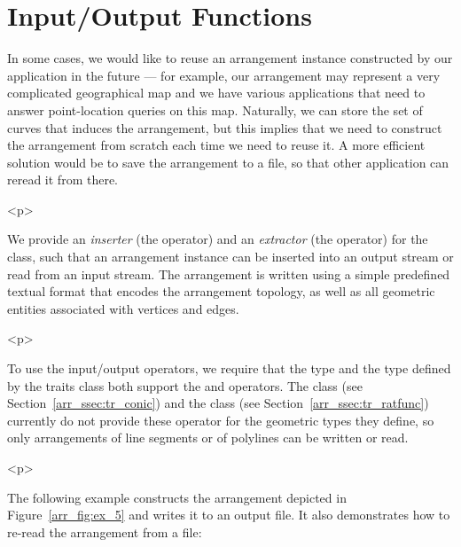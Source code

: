 \section{Input/Output Functions}
\label{arr_sec:io}
%
In some cases, we would like to reuse an arrangement instance constructed
by our application in the future --- for example, our arrangement may
represent a very complicated geographical map and we have various
applications that need to answer point-location queries on this map.
Naturally, we can store the set of curves that induces the arrangement,
but this implies that we need to construct the arrangement from
scratch each time we need to reuse it. A more efficient solution would
be to save the arrangement to a file, so that other application can
reread it from there.

\begin{ccHtmlOnly}<p>\end{ccHtmlOnly}
We provide an {\em inserter} (the \ccc{<<} operator) and an {\em extractor}
(the \ccc{>>} operator) for the  class,
such that an arrangement instance can be inserted into an output stream
or read from an input stream. The arrangement is written using a simple
predefined textual format that encodes the arrangement topology, as
well as all geometric entities associated with vertices and edges.

\begin{ccHtmlOnly}<p>\end{ccHtmlOnly}
To use the input/output operators, we require that the  type
and the  type defined by the traits class both
support the \ccc{<<} and\ccc{>>} operators. The 
class (see Section~\ref{arr_ssec:tr_conic}) and the 
 class (see Section~\ref{arr_ssec:tr_ratfunc})
currently do not provide these operator for the geometric types
they define, so only arrangements of line segments or of polylines can
be written or read.

\begin{ccHtmlOnly}<p>\end{ccHtmlOnly}
The following example constructs the arrangement depicted in 
Figure~\ref{arr_fig:ex_5} and writes it to an output file. It also
demonstrates how to re-read the arrangement from a file:



